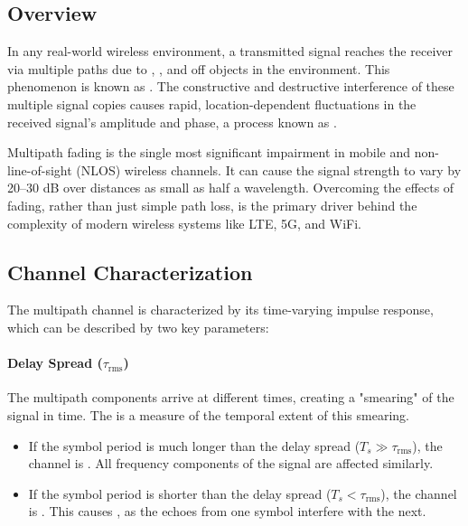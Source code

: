 \subsection{Overview}

In any real-world wireless environment, a transmitted signal reaches the receiver via multiple paths due to , , and  off objects in the environment. This phenomenon is known as . The constructive and destructive interference of these multiple signal copies causes rapid, location-dependent fluctuations in the received signal's amplitude and phase, a process known as .

\begin{keyconcept}
    Multipath fading is the single most significant impairment in mobile and non-line-of-sight (NLOS) wireless channels. It can cause the signal strength to vary by 20--30 dB over distances as small as half a wavelength. Overcoming the effects of fading, rather than just simple path loss, is the primary driver behind the complexity of modern wireless systems like LTE, 5G, and WiFi.
\end{keyconcept}


\subsection{Channel Characterization}

The multipath channel is characterized by its time-varying impulse response, which can be described by two key parameters:

\paragraph{Delay Spread ($\tau_{\text{rms}}$)}
The multipath components arrive at different times, creating a "smearing" of the signal in time. The  is a measure of the temporal extent of this smearing.
\begin{itemize}
    \item If the symbol period is much longer than the delay spread ($T_s \gg \tau_{\text{rms}}$), the channel is . All frequency components of the signal are affected similarly.
    \item If the symbol period is shorter than the delay spread ($T_s < \tau_{\text{rms}}$), the channel is . This causes , as the echoes from one symbol interfere with the next.
\end{itemize}

